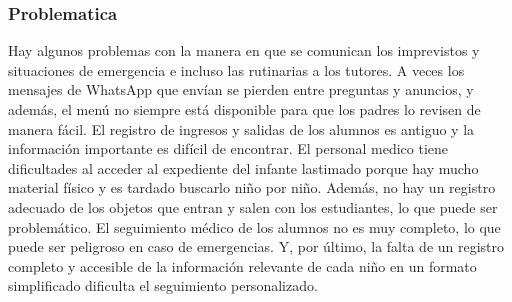 \documentclass{article}
\begin{document}
\subsubsection{Problematica}

Hay algunos problemas con la manera en que se comunican los imprevistos y situaciones de emergencia e incluso las rutinarias a los tutores. A veces los mensajes de WhatsApp que envían se pierden entre preguntas y anuncios, y además, el menú no siempre está disponible para que los padres lo revisen de manera fácil. El registro de ingresos y salidas de los alumnos es antiguo y la información importante es difícil de encontrar.
El personal medico tiene dificultades al acceder al expediente del infante lastimado porque hay mucho material físico y es tardado buscarlo niño por niño.
Además, no hay un registro adecuado de los objetos que entran y salen con los estudiantes, lo que puede ser problemático. El seguimiento médico de los alumnos no es muy completo, lo que puede ser peligroso en caso de emergencias. Y, por último, la falta de un registro completo y accesible de la información relevante de cada niño en un formato simplificado dificulta el seguimiento personalizado.
\end{document}

